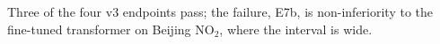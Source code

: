 Three of the four v3 endpoints pass; the failure, E7b, is non-inferiority to the fine-tuned transformer on Beijing
NO$_2$, where the interval is wide.
